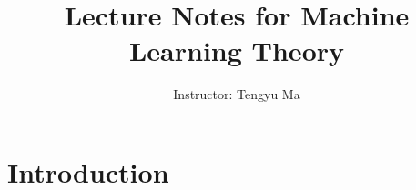 \documentclass[oneside, openany]{book}
\theoremstyle{definition}
\theoremstyle{remark}
\numberwithin{section}{chapter}
\numberwithin{equation}{chapter}
\begin{document}
	
	\frontmatter
	
	\title{Lecture Notes for Machine Learning Theory}
	
	
	\author{Instructor: Tengyu Ma
	}
	
	
	
	
	
	
	
	\maketitle
	
	
	
	\tableofcontents
	
	\mainmatter
	\let\sec\section
	\let\subsec\subsection
	\let\subsubsec\subsubsection
	
	
	
	
	\chapter*{Introduction} \label{chap:iintro}
	
\end{document}
